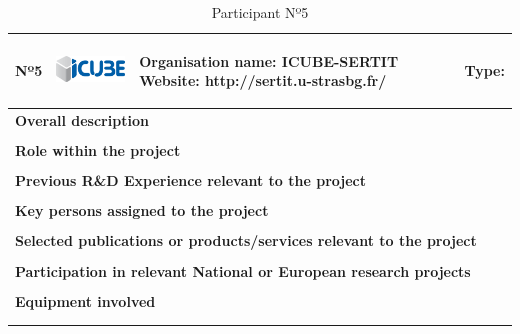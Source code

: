 \begin{longtable}[H]{|p{0.7cm}|p{4cm}|p{7cm}|p{1.3cm}|}
	\hline
	\begin{center} Nº5 \end{center} & \begin{center} \includegraphics[scale=0.6]{./logos/Icube_web} \end{center} & \begin{center} \textbf{Organisation name:} ICUBE-SERTIT \newline \textbf{Website:} http://sertit.u-strasbg.fr/ \end{center} & \begin{center} Type: \end{center} \\ \hline
	
	\multicolumn{4}{|p{13cm}|}{\textbf{Overall description}}  \\ \hline
	
	\multicolumn{4}{|p{13cm}|}{}  \\ \hline
	
	\multicolumn{4}{|p{13cm}|}{\textbf{Role within the project}}   \\ \hline
	
	\multicolumn{4}{|p{13cm}|}{}  \\ \hline
	
	\multicolumn{4}{|p{13cm}|}{\textbf{Previous R\&D Experience relevant to the project}}  \\ \hline
	
	\multicolumn{4}{|p{13cm}|}{}  \\ \hline
	
	\multicolumn{4}{|p{13cm}|}{\textbf{Key persons assigned to the project}}   \\ \hline
	
	\multicolumn{4}{|p{13cm}|}{}  \\ \hline
	
	\multicolumn{4}{|p{13cm}|}{\textbf{Selected publications or products/services relevant to the project}}  \\ \hline
	
	\multicolumn{4}{|p{13cm}|}{}  \\ \hline
	
	\multicolumn{4}{|p{13cm}|}{\textbf{Participation in relevant National or European research projects}}  \\ \hline
	
	\multicolumn{4}{|p{13cm}|}{}  \\ \hline
	
	\multicolumn{4}{|p{13cm}|}{\textbf{Equipment involved}}  \\ \hline
	
	\multicolumn{4}{|p{13cm}|}{}  \\ \hline
	\caption{Participant Nº5}
\end{longtable}

